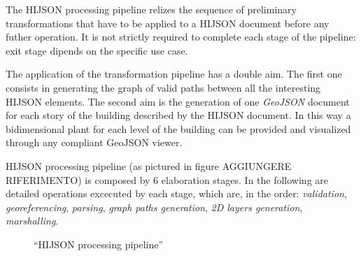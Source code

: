 \documentclass{sig-alternate}
\begin{document}
The HIJSON processing pipeline relizes the sequence of preliminary
transformations that have to be applied to a HIJSON document before any
futher operation. It is not strictly required to complete each stage of
the pipeline: exit stage dipends on the specific use case.

The application of the transformation pipeline has a double aim. The
first one consists in generating the graph of valid paths between all
the interesting HIJSON elements. The second aim is the generation of one
\emph{GeoJSON} document for each story of the building described by the
HIJSON document. In this way a bidimensional plant for each level of the
building can be provided and visualized through any compliant GeoJSON
viewer.

HIJSON processing pipeline (as pictured in figure AGGIUNGERE
RIFERIMENTO) is composed by 6 elaboration stages. In the following are
detailed operations excecuted by each stage, which are, in the order:
\emph{validation}, \emph{georeferencing}, \emph{parsing}, \emph{graph
paths generation}, \emph{2D layers generation}, \emph{marshalling}.

\begin{figure}[!htbp]
\centering
{}
\caption{``HIJSON processing pipeline''}
\label{fig:pipeline}
\end{figure}
\end{document}
